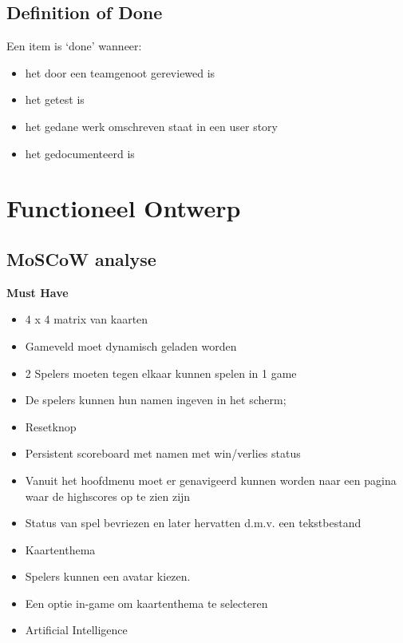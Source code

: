 \documentclass[a4paper,titlepage,11pt]{article}
\begin{document}
\subsection{Definition of Done}

Een item is `done' wanneer:

\begin{itemize}

\item het door een teamgenoot gereviewed is
\item het getest is
\item het gedane werk omschreven staat in een user story
\item het gedocumenteerd is
\end{itemize}

\clearpage

\section{Functioneel Ontwerp}

\subsection{MoSCoW analyse}

{\bf Must Have}

\begin{itemize}
\item 4 x 4 matrix van kaarten
\item Gameveld moet dynamisch geladen worden
\item 2 Spelers moeten tegen elkaar kunnen spelen in 1 game
\item De spelers kunnen hun namen ingeven in het scherm;
\item Resetknop
\item Persistent scoreboard met namen met win/verlies status
\item Vanuit het hoofdmenu moet er genavigeerd kunnen worden naar een pagina waar de 
  highscores op te zien zijn
\item Status van spel bevriezen en later hervatten d.m.v. een tekstbestand
\end{itemize}

\begin{itemize}
\item Kaartenthema
\end{itemize}
\begin{itemize}
\item Spelers kunnen een avatar kiezen.
\end{itemize}
\begin{itemize}
\item Een optie in-game om kaartenthema te selecteren
\item Artificial Intelligence
\end{itemize}
\end{document}
